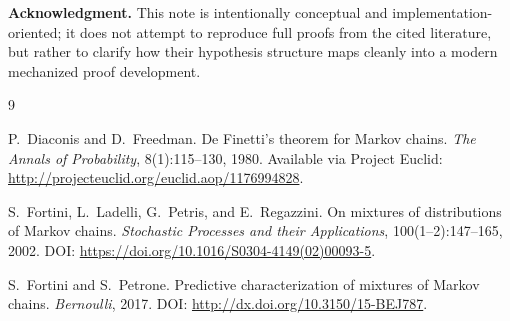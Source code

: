 \documentclass[11pt]{article}
\begin{document}
\bigskip
\noindent\textbf{Acknowledgment.} This note is intentionally conceptual and implementation-oriented; it does not attempt to reproduce full proofs from the cited literature, but rather to clarify how their hypothesis structure maps cleanly into a modern mechanized proof development.


\begin{thebibliography}{9}

P.~Diaconis and D.~Freedman.
\newblock De {F}inetti's theorem for {M}arkov chains.
\newblock \emph{The Annals of Probability}, 8(1):115--130, 1980.
\newblock Available via Project Euclid: \url{http://projecteuclid.org/euclid.aop/1176994828}.

S.~Fortini, L.~Ladelli, G.~Petris, and E.~Regazzini.
\newblock On mixtures of distributions of {M}arkov chains.
\newblock \emph{Stochastic Processes and their Applications}, 100(1--2):147--165, 2002.
\newblock DOI: \url{https://doi.org/10.1016/S0304-4149(02)00093-5}.

S.~Fortini and S.~Petrone.
\newblock Predictive characterization of mixtures of {M}arkov chains.
\newblock \emph{Bernoulli}, 2017.
\newblock DOI: \url{http://dx.doi.org/10.3150/15-BEJ787}.

\end{thebibliography}
\end{document}
